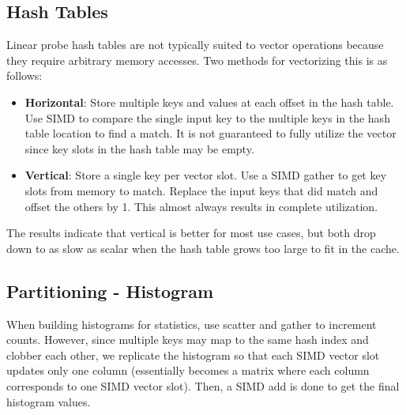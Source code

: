 \documentclass[11pt]{article}
\begin{document}
\subsection{Hash Tables}
Linear probe hash tables are not typically suited to vector operations because they require arbitrary memory accesses. Two methods for vectorizing this is as follows:
\begin{itemize}
	\item 
	\textbf{Horizontal}: 
	Store multiple keys and values at each offset in the hash table. Use SIMD to compare the single input key to the multiple keys in the hash table location to find a match. It is not guaranteed to fully utilize the vector since key slots in the hash table may be empty.
	
	\item 
	\textbf{Vertical}: Store a single key per vector slot. Use a SIMD gather to get key slots from memory to match. Replace the input keys that did match and offset the others by 1. This almost always results in complete utilization.
        
\end{itemize}

The results indicate that vertical is better for most use cases, but both drop down to as slow as scalar when the hash table grows too large to fit in the cache.

\subsection{Partitioning - Histogram}
When building histograms for statistics, use scatter and gather to increment counts. However, since multiple keys may map to the same hash index and clobber each other, we replicate the histogram so that each SIMD vector slot updates only one column (essentially becomes a matrix where each column corresponds to one SIMD vector slot). Then, a SIMD add is done to get the final histogram values.

\newpage


\end{document}
